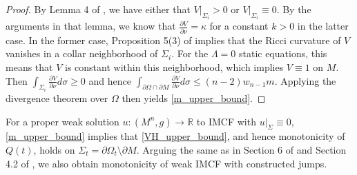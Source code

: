 \documentclass[12pt,twoside]{article}
\theoremstyle{plain}
\theoremstyle{definition}
\theoremstyle{remark}
\numberwithin{equation}{section}
\begin{document}
\begin{proof}
By Lemma 4 of \cite{HMM}, we have either that $V|_{\Sigma_{i}} > 0$ or $V|_{\Sigma_{i}} \equiv 0$. By the arguments in that lemma, we know that $\frac{\partial V}{\partial \nu} = \kappa$ for a constant $k >0$ in the latter case. In the former case, Proposition 5(3) of \cite{HMM} implies that the Ricci curvature of $V$ vanishes in a collar neighborhood of $\Sigma_{i}$. For the $\Lambda =0$ static equations, this means that $V$ is constant within this neighborhood, which implies $V \equiv 1$ on $M$. Then $\int_{\Sigma_{i}} \frac{\partial V}{\partial \nu} d\sigma \geq 0$ and hence $\int_{\partial \Omega \cap \partial M} \frac{\partial V}{\partial \nu} d\sigma \leq (n-2)w_{n-1} m$. Applying the divergence theorem over $\Omega$ then yields \eqref{m_upper_bound}.
\end{proof}
For a proper weak solution $u: (M^{n},g) \rightarrow \mathbb{R}$ to IMCF with $u|_{\Sigma} \equiv 0$, \eqref{m_upper_bound} implies that \eqref{VH_upper_bound}, and hence monotonicity of $Q(t)$, holds on $\Sigma_{t}= \partial \Omega_{t} \setminus \partial M$. Arguing the same as in Section 6 of \cite{HI} and Section 4.2 of \cite{Wei}, we also obtain monotonicity of weak IMCF with constructed jumps. 
\end{document}

